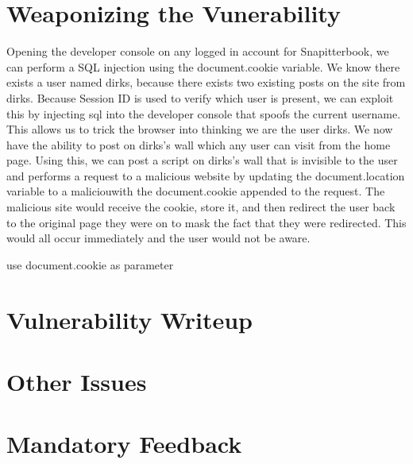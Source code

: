 \documentclass[12pt]{article}
\begin{document}
\maketitle

\section{Weaponizing the Vunerability}
Opening the developer console on any logged in account for Snapitterbook, we can perform a SQL injection using the document.cookie variable.  We know there exists a user named dirks, because there exists two existing posts on the site from dirks.  Because Session ID is used to verify which user is present, we can exploit this by injecting sql into the developer console that spoofs the current username.  This allows us to trick the browser into thinking we are the user dirks.  We now have the ability to post on dirks's wall which any user can visit from the home page.  Using this, we can post a script on dirks's wall that is invisible to the user and performs a request to a malicious website by updating the document.location variable to a maliciouwith the document.cookie appended to the request.  The malicious site would receive the cookie, store it, and then redirect the user back to the original page they were on to mask the fact that they were redirected.  This would all occur immediately and the user would not be aware.

use document.cookie as parameter
\section{Vulnerability Writeup}

\section{Other Issues}

\section{Mandatory Feedback}
\end{document}
